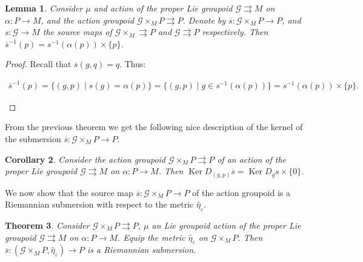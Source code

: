 \documentclass[12pt,a4paper,reqno]{amsart}
\DeclareMathOperator{\kernel}{Ker}
\newcommand{\1}{\mathbbm{1}} %
\newcommand{\G}{\mathcal{G}} %
\newtheorem{thm}{Theorem}[section]
\newtheorem{lemma}[thm]{Lemma}
\newtheorem{cor}[thm]{Corollary}
\theoremstyle{definition}
\theoremstyle{TheoremNum}
\begin{document}
\begin{lemma}
Consider $\mu$ and  action of the proper Lie groupoid $\G\rightrightarrows M$ on $\alpha\colon P\to M$, and the action groupoid $\G\times_M P \rightrightarrows P$. Denote by $\overline{s}\colon \G\times_M P\to P$, and $s\colon \G\to M$ the source maps of $\G\times_M \rightrightarrows P$ and $\G\rightrightarrows P$ respectively. Then $\overline{s}^{-1}(p) = s^{-1}(\alpha(p))\times\{p\}$.
\end{lemma}

\begin{proof}
Recall  that $\overline{s}(g,q) = q$. Thus:
\begin{linenomath}
\begin{align*}
\overline{s}^{-1}(p) = \{(g,p)\mid s(g) = \alpha(p) \} =\{(g,p)\mid g\in s^{-1}(\alpha(p))\}= s^{-1}(\alpha(p))\times \{p\}.
\end{align*}
\end{linenomath}
\end{proof}

From the previous theorem we get the following nice description of the kernel of the submersion $\overline{s}\colon \G\times_M P\to P$.  

\begin{cor}
Consider the action groupoid $\G\times_M P\rightrightarrows P$ of an action of the proper Lie groupoid $\G\rightrightarrows M$ on $\alpha\colon P\to M$. Then $\kernel D_{(g,p)}\overline{s} = \kernel D_g s\times \{0\}$.
\end{cor}

We now show that the source map $\overline{s}\colon \G\times_M P\to P$ of the action groupoid is a Riemannian submersion with respect to the metric $\widehat{\eta}_\varepsilon$.

\begin{thm}\th\label{T: source map for the action groupoid is a Riemannian submersion}
Consider $\G\times_M P\rightrightarrows P$, $\mu$ an Lie groupoid action of the proper Lie groupoid $\G\rightrightarrows M$ on $\alpha\colon P\to M$. Equip the metric $\widehat{\eta}_\varepsilon$ on $\G\times_M P$. Then $\overline{s}\colon (\G\times_M P,\widehat{\eta}_\varepsilon)\to P$ is a Riemannian submersion.
\end{thm}
\end{document}
